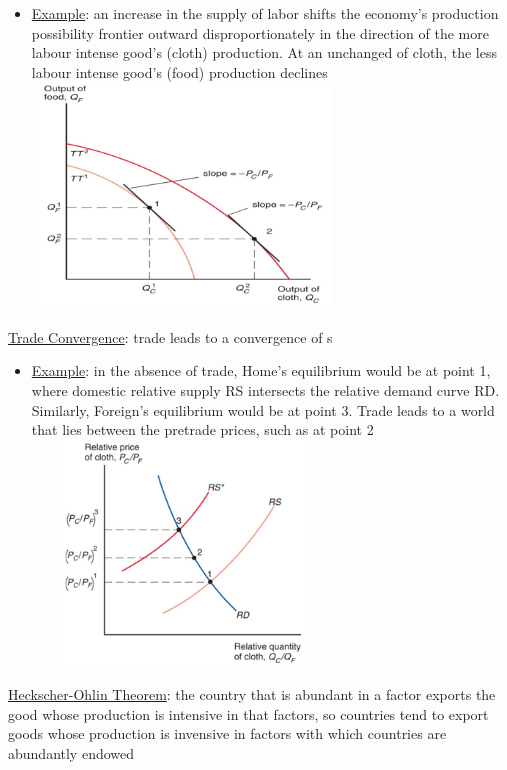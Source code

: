 \documentclass{article}
\begin{document}
\begin{itemize}
  \item  \underline{Example}: an increase in the supply of labor shifts the economy’s production possibility frontier outward disproportionately in the direction of the more labour intense good's (cloth) production. At an unchanged  of cloth, the less labour intense good's (food) production declines \\
  \includegraphics[width=8cm, height=6cm]{pic4}
\end{itemize}
\underline{Trade Convergence}: trade leads to a convergence of s
\begin{itemize}
  \item  \underline{Example}: in the absence of trade, Home’s equilibrium would be at point 1, where domestic relative supply RS intersects the relative demand curve RD. Similarly, Foreign’s equilibrium would be at point 3. Trade leads to a world  that lies between the pretrade prices, such as at point 2 \\
  \includegraphics[width=8cm, height=6cm]{pic5}
\end{itemize}
\underline{Heckscher-Ohlin Theorem}: the country that is abundant in a factor exports the good whose production is intensive in that factors, so countries tend to export goods whose production is invensive in factors with which countries are abundantly endowed \\
\end{document}
